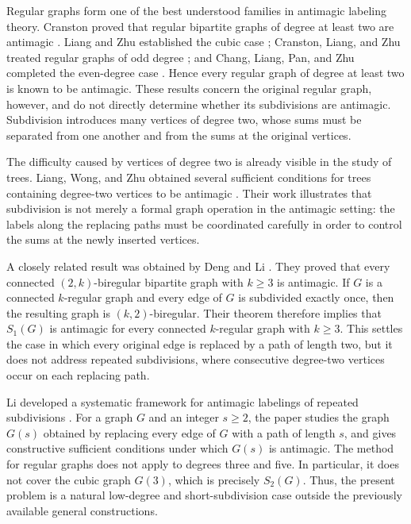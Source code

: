 \documentclass[preprint,12pt]{elsarticle}
\begin{document}
Regular graphs form one of the best understood families in antimagic
labeling theory. Cranston proved that regular bipartite graphs of degree
at least two are antimagic \cite{cranston2009regular}. Liang and Zhu
established the cubic case \cite{liang2014cubic}; Cranston, Liang, and Zhu
treated regular graphs of odd degree \cite{cranston2015odd}; and Chang,
Liang, Pan, and Zhu completed the even-degree case
\cite{chang2016regular}. Hence every regular graph of degree at least two
is known to be antimagic. These results concern the original regular
graph, however, and do not directly determine whether its subdivisions
are antimagic. Subdivision introduces many vertices of degree two, whose
sums must be separated from one another and from the sums at the original
vertices.

The difficulty caused by vertices of degree two is already visible in the
study of trees. Liang, Wong, and Zhu obtained several sufficient
conditions for trees containing degree-two vertices to be antimagic
\cite{liang2014trees}. Their work illustrates that subdivision is not
merely a formal graph operation in the antimagic setting: the labels along
the replacing paths must be coordinated carefully in order to control the
sums at the newly inserted vertices.

A closely related result was obtained by Deng and Li
\cite{deng2022biregular}. They proved that every connected
\((2,k)\)-biregular bipartite graph with \(k\ge3\) is antimagic. If \(G\)
is a connected \(k\)-regular graph and every edge of \(G\) is subdivided
exactly once, then the resulting graph is \((k,2)\)-biregular. Their
theorem therefore implies that \(S_1(G)\) is antimagic for every connected
\(k\)-regular graph with \(k\ge3\). This settles the case in which every
original edge is replaced by a path of length two, but it does not address
repeated subdivisions, where consecutive degree-two vertices occur on
each replacing path.

Li developed a systematic framework for antimagic labelings of repeated
subdivisions \cite{li2025subdivisions}. For a graph \(G\) and an integer
\(s\ge2\), the paper studies the graph \(G(s)\) obtained by replacing
every edge of \(G\) with a path of length \(s\), and gives constructive
sufficient conditions under which \(G(s)\) is antimagic. The method for
regular graphs does not apply to degrees three and five. In particular,
it does not cover the cubic graph \(G(3)\), which is precisely \(S_2(G)\).
Thus, the present problem is a natural low-degree and short-subdivision
case outside the previously available general constructions.
\end{document}
